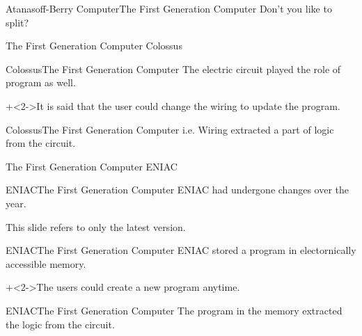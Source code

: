 \begin{frame}{Atanasoff-Berry Computer}{The First Generation Computer}
    {\Large Don't you like to split?}
\end{frame}


\begin{frame}{The First Generation Computer}{}
    {\Huge Colossus}
\end{frame}


\begin{frame}{Colossus}{The First Generation Computer}
    The electric circuit played the role of program as well.
    \vspace{4ex}

    \onslide+<2->{It is said that the user could change the wiring to update the program.}
\end{frame}


\begin{frame}{Colossus}{The First Generation Computer}
    i.e. Wiring extracted a part of logic from the circuit.
\end{frame}


\begin{frame}{The First Generation Computer}{}
    {\Huge ENIAC}
\end{frame}


\begin{frame}{ENIAC}{The First Generation Computer}
    ENIAC had undergone changes over the year.
    \vspace{4ex}

    This slide refers to only the latest version.
\end{frame}


\begin{frame}{ENIAC}{The First Generation Computer}
    ENIAC stored a program in electornically accessible memory.
    \vspace{4ex}

    \onslide+<2->{The users could create a new program anytime.}
\end{frame}


\begin{frame}{ENIAC}{The First Generation Computer}
    The program in the memory extracted the logic from the circuit.
\end{frame}
